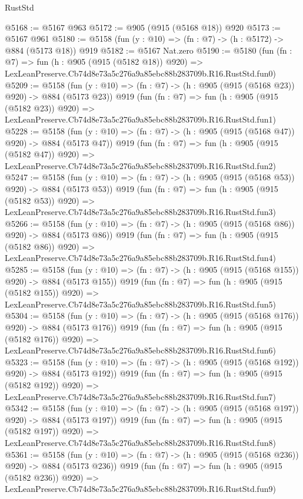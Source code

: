\begin{lexlean}{RustStd}
\begin{coremodule}
@5168 := @5167 @963
@5172 := @905 (@915 (@5168 @18)) @920
@5173 := @5167 @961
@5180 := @5158 (fun (y : @10) => (fn : @7) -> (h : @5172) -> @884 (@5173 @18)) @919
@5182 := @5167 Nat.zero
@5190 := @5180
    (fun (fn : @7) =>
    fun (h : @905 (@915 (@5182 @18)) @920) =>
    LexLeanPreserve.Cb74d8e73a5c276a9a85ebc88b283709b.R16.RustStd.fun0)
@5209 := @5158
    (fun (y : @10) => (fn : @7) -> (h : @905 (@915 (@5168 @23)) @920) -> @884 (@5173 @23))
    @919
    (fun (fn : @7) =>
    fun (h : @905 (@915 (@5182 @23)) @920) =>
    LexLeanPreserve.Cb74d8e73a5c276a9a85ebc88b283709b.R16.RustStd.fun1)
@5228 := @5158
    (fun (y : @10) => (fn : @7) -> (h : @905 (@915 (@5168 @47)) @920) -> @884 (@5173 @47))
    @919
    (fun (fn : @7) =>
    fun (h : @905 (@915 (@5182 @47)) @920) =>
    LexLeanPreserve.Cb74d8e73a5c276a9a85ebc88b283709b.R16.RustStd.fun2)
@5247 := @5158
    (fun (y : @10) => (fn : @7) -> (h : @905 (@915 (@5168 @53)) @920) -> @884 (@5173 @53))
    @919
    (fun (fn : @7) =>
    fun (h : @905 (@915 (@5182 @53)) @920) =>
    LexLeanPreserve.Cb74d8e73a5c276a9a85ebc88b283709b.R16.RustStd.fun3)
@5266 := @5158
    (fun (y : @10) => (fn : @7) -> (h : @905 (@915 (@5168 @86)) @920) -> @884 (@5173 @86))
    @919
    (fun (fn : @7) =>
    fun (h : @905 (@915 (@5182 @86)) @920) =>
    LexLeanPreserve.Cb74d8e73a5c276a9a85ebc88b283709b.R16.RustStd.fun4)
@5285 := @5158
    (fun (y : @10) => (fn : @7) -> (h : @905 (@915 (@5168 @155)) @920) -> @884 (@5173 @155))
    @919
    (fun (fn : @7) =>
    fun (h : @905 (@915 (@5182 @155)) @920) =>
    LexLeanPreserve.Cb74d8e73a5c276a9a85ebc88b283709b.R16.RustStd.fun5)
@5304 := @5158
    (fun (y : @10) => (fn : @7) -> (h : @905 (@915 (@5168 @176)) @920) -> @884 (@5173 @176))
    @919
    (fun (fn : @7) =>
    fun (h : @905 (@915 (@5182 @176)) @920) =>
    LexLeanPreserve.Cb74d8e73a5c276a9a85ebc88b283709b.R16.RustStd.fun6)
@5323 := @5158
    (fun (y : @10) => (fn : @7) -> (h : @905 (@915 (@5168 @192)) @920) -> @884 (@5173 @192))
    @919
    (fun (fn : @7) =>
    fun (h : @905 (@915 (@5182 @192)) @920) =>
    LexLeanPreserve.Cb74d8e73a5c276a9a85ebc88b283709b.R16.RustStd.fun7)
@5342 := @5158
    (fun (y : @10) => (fn : @7) -> (h : @905 (@915 (@5168 @197)) @920) -> @884 (@5173 @197))
    @919
    (fun (fn : @7) =>
    fun (h : @905 (@915 (@5182 @197)) @920) =>
    LexLeanPreserve.Cb74d8e73a5c276a9a85ebc88b283709b.R16.RustStd.fun8)
@5361 := @5158
    (fun (y : @10) => (fn : @7) -> (h : @905 (@915 (@5168 @236)) @920) -> @884 (@5173 @236))
    @919
    (fun (fn : @7) =>
    fun (h : @905 (@915 (@5182 @236)) @920) =>
    LexLeanPreserve.Cb74d8e73a5c276a9a85ebc88b283709b.R16.RustStd.fun9)

\end{coremodule}
\end{lexlean}
